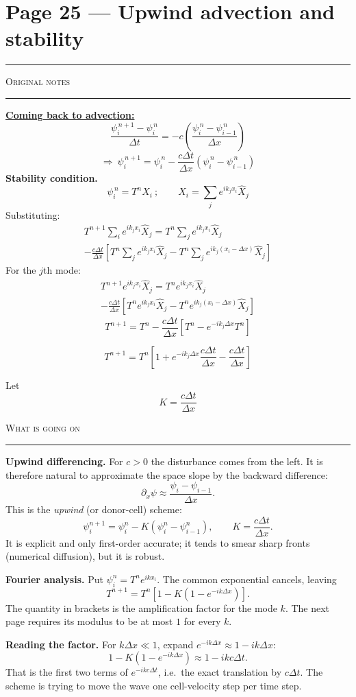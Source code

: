 \documentclass[10pt,a4paper]{article}
\newcommand{\pairpage}[3]{%
  \clearpage
  \section*{\normalsize Page #1}
  \vspace{-0.9em}
  {\color{black!35}\rule{\linewidth}{0.4pt}}\par\vspace{0.2em}
  \noindent
  \begin{minipage}[t]{0.473\textwidth}
    {\scriptsize\textsc{Original notes}}\par\vspace{0.15em}
    {\color{black!25}\rule{\linewidth}{0.3pt}}\par\vspace{0.2em}
    #2
  \end{minipage}%
  \hfill
  \begin{minipage}[t]{0.473\textwidth}
    {\scriptsize\textsc{What is going on}}\par\vspace{0.15em}
    {\color{black!25}\rule{\linewidth}{0.3pt}}\par\vspace{0.2em}
    #3
  \end{minipage}%
}
\begin{document}
\pairpage{25 --- Upwind advection and stability}{%
\textbf{\underline{Coming back to advection:}}
\[
\frac{\psi_i^{\,n+1}-\psi_i^{\,n}}{\Delta t}
=-c\left(\frac{\psi_i^{\,n}-\psi_{i-1}^{\,n}}{\Delta x}\right)
\]
\[
\Rightarrow\ \psi_i^{\,n+1}
=\psi_i^{\,n}-\frac{c\Delta t}{\Delta x}
\left(\psi_i^{\,n}-\psi_{i-1}^{\,n}\right)
\]
\textbf{Stability condition.}
\[
\psi_i^{\,n}=T^nX_i\ ;\qquad
X_i=\sum_j e^{ik_jx_i}\hat X_j
\]
Substituting:
\begin{multline*}
T^{n+1}\sum_i e^{ik_jx_i}\hat X_j
=T^n\sum_j e^{ik_jx_i}\hat X_j\\
-\frac{c\Delta t}{\Delta x}
\left[T^n\sum_j e^{ik_jx_i}\hat X_j
-T^n\sum_j e^{ik_j(x_i-\Delta x)}\hat X_j\right]
\end{multline*}
For the $j$th mode:
\begin{multline*}
T^{n+1}e^{ik_jx_i}\hat X_j
=T^ne^{ik_jx_i}\hat X_j\\
-\frac{c\Delta t}{\Delta x}
\left[T^ne^{ik_jx_i}\hat X_j
-T^ne^{ik_j(x_i-\Delta x)}\hat X_j\right]
\end{multline*}
\[
T^{n+1}=T^n-\frac{c\Delta t}{\Delta x}
\left[T^n-e^{-ik_j\Delta x}T^n\right]
\]
\begin{handbox}
\[
T^{n+1}=T^n\left[1+e^{-ik_j\Delta x}
\frac{c\Delta t}{\Delta x}-\frac{c\Delta t}{\Delta x}\!\right]
\]
\end{handbox}
Let
\[
K=\frac{c\Delta t}{\Delta x}
\]
}{%
\textbf{Upwind differencing.} For $c>0$ the disturbance comes from the
left. It is therefore natural to approximate the space slope by the
backward difference:
\[
\partial_x\psi\approx\frac{\psi_i-\psi_{i-1}}{\Delta x}.
\]
This is the \emph{upwind} (or donor-cell) scheme:
\[
\psi_i^{n+1}=\psi_i^n-K(\psi_i^n-\psi_{i-1}^n),
\qquad K=\frac{c\Delta t}{\Delta x}.
\]
It is explicit and only first-order accurate; it tends to smear sharp
fronts (numerical diffusion), but it is robust.

\textbf{Fourier analysis.} Put
$\psi_i^n=T^n e^{ikx_i}$. The common exponential cancels, leaving
\[
T^{n+1}=T^n\left[1-K(1-e^{-ik\Delta x})\right].
\]
The quantity in brackets is the amplification factor for the mode $k$.
The next page requires its modulus to be at most $1$ for every $k$.

\textbf{Reading the factor.} For $k\Delta x\ll1$, expand
$e^{-ik\Delta x}\approx1-ik\Delta x$:
\[
1-K(1-e^{-ik\Delta x})\approx1-ikc\Delta t.
\]
That is the first two terms of $e^{-ikc\Delta t}$, i.e.\ the exact
translation by $c\Delta t$. The scheme is trying to move the wave one
cell-velocity step per time step.
}
\end{document}
